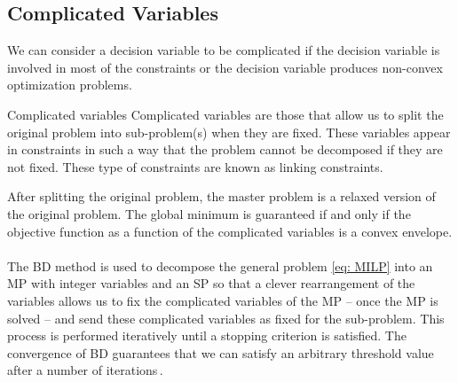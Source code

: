 \subsection{Complicated Variables}
We can consider a decision variable to be complicated if the decision variable is involved in most of the constraints or the decision variable produces non-convex optimization problems. 
\begin{definition}{}{Complicated variables}
Complicated variables are those that allow us to split the original problem into sub-problem(s) when they are fixed. These variables appear in constraints in such a way that the problem cannot be decomposed if they are not fixed. These type of constraints are known as linking constraints. 
\end{definition}
After splitting the original problem, the master problem is a relaxed version of the original problem. The global minimum is guaranteed if and only if the objective function as a function of the complicated variables is a convex envelope.\\\\
The BD method is used to decompose the general problem \eqref{eq: MILP} into an MP with integer variables and an SP so that a clever rearrangement of the variables allows us to fix the complicated variables of the MP -- once the MP is solved -- and send these complicated variables as fixed for the sub-problem. This process is performed iteratively until a stopping criterion is satisfied. The convergence of BD guarantees that we can satisfy an arbitrary threshold value after a number of iterations\,\cite{Sahinidis1991BDConvergence}. 
